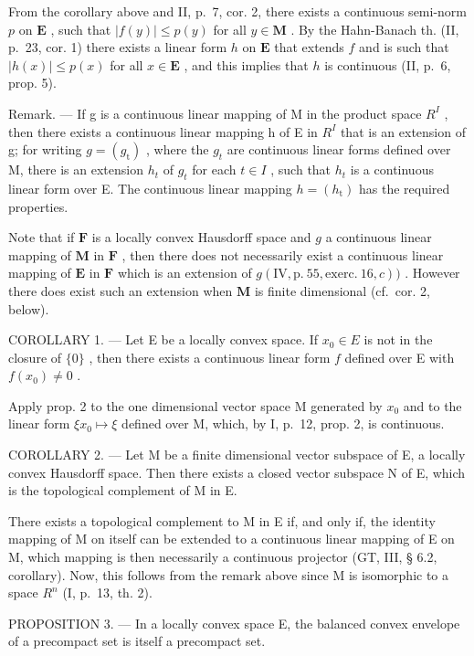 From the corollary above and II, p.~7, cor. 2, there exists a continuous semi-norm \(p\) on \(\mathbf{E}\) , such that \(|f(y)| \leqslant p(y)\) for all \(y \in \mathbf{M}\) . By the Hahn-Banach th. (II, p.~23, cor. 1) there exists a linear form \(h\) on \(\mathbf{E}\) that extends \(f\) and is such that \(|h(x)| \leqslant p(x)\) for all \(x \in \mathbf{E}\) , and this implies that \(h\) is continuous (II, p.~6, prop. 5).

Remark. --- If g is a continuous linear mapping of M in the product space \(R^{I}\) , then there exists a continuous linear mapping h of E in \(R^{I}\) that is an extension of g; for writing \(g = (g_{\mathrm{t}})\) , where the \(g_{t}\) are continuous linear forms defined over M, there is an extension \(h_{t}\) of \(g_{t}\) for each \(t \in I\) , such that \(h_{t}\) is a continuous linear form over E. The continuous linear mapping \(h = (h_{\mathrm{t}})\) has the required properties.

Note that if \(\mathbf{F}\) is a locally convex Hausdorff space and \(g\) a continuous linear mapping of \(\mathbf{M}\) in \(\mathbf{F}\) , then there does not necessarily exist a continuous linear mapping of \(\mathbf{E}\) in \(\mathbf{F}\) which is an extension of \(g(\mathrm{IV},\mathrm{p.~55},\mathrm{exerc.~16},c))\) . However there does exist such an extension when \(\mathbf{M}\) is finite dimensional (cf.~cor. 2, below).

COROLLARY 1. --- Let E be a locally convex space. If \(x_0 \in E\) is not in the closure of \(\{0\}\) , then there exists a continuous linear form \(f\) defined over E with \(f(x_0) \neq 0\) .

Apply prop. 2 to the one dimensional vector space M generated by \(x_0\) and to the linear form \(\xi x_0 \mapsto \xi\) defined over M, which, by I, p.~12, prop. 2, is continuous.

COROLLARY 2. --- Let M be a finite dimensional vector subspace of E, a locally convex Hausdorff space. Then there exists a closed vector subspace N of E, which is the topological complement of M in E.

There exists a topological complement to M in E if, and only if, the identity mapping of M on itself can be extended to a continuous linear mapping of E on M, which mapping is then necessarily a continuous projector (GT, III, § 6.2, corollary). Now, this follows from the remark above since M is isomorphic to a space \(R^{n}\) (I, p.~13, th. 2).

PROPOSITION 3. --- In a locally convex space E, the balanced convex envelope of a precompact set is itself a precompact set.

